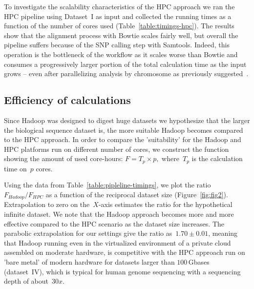 \documentclass[10pt]{article}
\newcommand{\COM}[1]{{\color{blue} #1 }}
\begin{document}
To investigate the scalability characteristics of the HPC approach we ran the
HPC pipeline using Dataset~I as input and collected the running times as a
function of the number of cores used (Table~\ref{table:timings-hpc}). The results show that the
alignment process with Bowtie scales fairly well, but overall the pipeline
suffers because of the SNP calling step with Samtools. Indeed, this operation
is the bottleneck of the workflow as it scales
worse than Bowtie and consumes a progressively larger portion of the total
calculation time as the input grows -- even after parallelizing analysis by
chromosome as previously suggested~\cite{biostars_samtools}.



\subsection*{Efficiency of calculations}

Since Hadoop was designed to digest huge datasets\cite{hadoop,lin2010} we hypothesize that the larger the biological sequence dataset is, the more suitable Hadoop becomes compared to the HPC approach. In order to compare the 'suitability' for the Hadoop and HPC platforms run on different number of cores, we construct the function showing the amount of used core-hours:
$F=T_{p}\times p,$ where~$T_{p}$ is the calculation time on~$p$ cores. 

Using the data from Table~\ref{table:pipleline-timings}, we plot the ratio $F_{Hadoop}/F_{HPC}$ as a function of the reciprocal dataset size (Figure~\ref{fig:fig2}). Extrapolation to zero on the~$X$-axis estimates the ratio for the hypothetical infinite dataset. We note that the Hadoop approach becomes more and more effective compared to the HPC scenario as the dataset size increases. 
The parabolic extrapolation for our settings give the ratio as~$1.70\pm0.01$, meaning that Hadoop running even in the virtualized environment of a private cloud assembled on moderate hardware, is competitive with the HPC approach run on 'bare metal' of modern hardware for datasets larger than $100$\,Gbases (dataset~IV), which is typical for human genome sequencing with a sequencing depth of about~$30x$.
\end{document}
